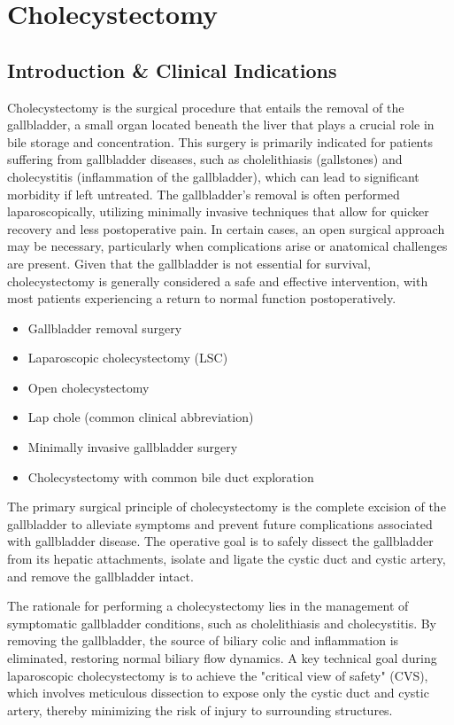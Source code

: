 \chapter{Cholecystectomy}

\section*{Introduction \& Clinical Indications}
Cholecystectomy is the surgical procedure that entails the removal of the gallbladder, a small organ located beneath the liver that plays a crucial role in bile storage and concentration. This surgery is primarily indicated for patients suffering from gallbladder diseases, such as cholelithiasis (gallstones) and cholecystitis (inflammation of the gallbladder), which can lead to significant morbidity if left untreated. The gallbladder's removal is often performed laparoscopically, utilizing minimally invasive techniques that allow for quicker recovery and less postoperative pain. In certain cases, an open surgical approach may be necessary, particularly when complications arise or anatomical challenges are present. Given that the gallbladder is not essential for survival, cholecystectomy is generally considered a safe and effective intervention, with most patients experiencing a return to normal function postoperatively.

\begin{itemize}
  \item Gallbladder removal surgery
  \item Laparoscopic cholecystectomy (LSC)
  \item Open cholecystectomy
  \item Lap chole (common clinical abbreviation)
  \item Minimally invasive gallbladder surgery
  \item Cholecystectomy with common bile duct exploration
\end{itemize}

The primary surgical principle of cholecystectomy is the complete excision of the gallbladder to alleviate symptoms and prevent future complications associated with gallbladder disease. The operative goal is to safely dissect the gallbladder from its hepatic attachments, isolate and ligate the cystic duct and cystic artery, and remove the gallbladder intact. 

The rationale for performing a cholecystectomy lies in the management of symptomatic gallbladder conditions, such as cholelithiasis and cholecystitis. By removing the gallbladder, the source of biliary colic and inflammation is eliminated, restoring normal biliary flow dynamics. A key technical goal during laparoscopic cholecystectomy is to achieve the "critical view of safety" (CVS), which involves meticulous dissection to expose only the cystic duct and cystic artery, thereby minimizing the risk of injury to surrounding structures.

